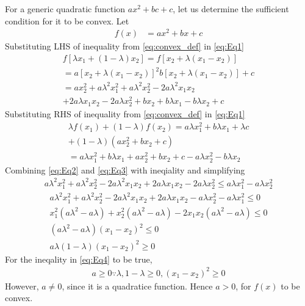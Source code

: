 \documentclass[12pt]{article}
\providecommand{\brak}[1]{\ensuremath{\left(#1\right)}}
\providecommand{\sbrak}[1]{\ensuremath{{}\left[#1\right]}}
\begin{document}
\begin{enumerate}
For a generic quadratic function $ax^2+bc+c$, let us determine the sufficient condition for it to be convex. Let 
\begin{align}
	\label{eq:Eq1}
	f\brak{x} &= ax^2+bx+c 
\end{align}
Substituting LHS of inequality from \eqref{eq:convex_def} in \eqref{eq:Eq1}
\begin{multline}
   \label{eq:Eq2}
	f\sbrak{\lambda x_1 + \brak{1-\lambda}x_2}  = f\sbrak{x_2 + \lambda \brak{x_1-x_2}}\\ 
	   =  a\sbrak{x_2+\lambda\brak{x_1-x_2}}^2 b\sbrak{x_2+\lambda\brak{x_1-x_2}} + c \\ 
	   = ax_2^2 + a\lambda^2 x_1^2+a\lambda^2 x_2^2 - 2a\lambda^2 x_1x_2 \\ 
	   +2a\lambda x_1x_2 - 2a\lambda x_2^2+bx_2+b\lambda x_1-b\lambda x_2+c 
\end{multline} 
Substituting RHS of inequality from \eqref{eq:convex_def} in \eqref{eq:Eq1}
\begin{multline}
	\lambda f\brak{x_1} + \brak{1-\lambda}f\brak{x_2}  = a \lambda x_1^2 + b\lambda x_1 + \lambda c \\ 
		 + \brak{1-\lambda}\brak{ax_2^2+bx_2+c} \\
	\label{eq:Eq3}
		= a \lambda x_1^2 + b\lambda x_1 + ax_2^2 + bx_2 + c -a\lambda x_2^2 -b\lambda x_2
\end{multline} 
Combining \eqref{eq:Eq2} and \eqref{eq:Eq3} with ineqiality and simplifying
\begin{align}
a\lambda^2 x_1^2 + a\lambda^2 x_2^2 - 2a\lambda^2 x_1x_2 +2a\lambda x_1x_2 - 2a\lambda x_2^2 \leq a\lambda x_1^2  -a\lambda x_2^2  
\end{align} 
\begin{multline}
	\label{eq:Eq4}
	a\lambda^2 x_1^2 + a\lambda^2 x_2^2 - 2a\lambda^2 x_1x_2 +2a\lambda x_1x_2 - a\lambda x_2^2 - a\lambda x_1^2 \leq 0 \\ 
	   x_1^2\brak{a\lambda^2-a\lambda} + x_2^2\brak{a\lambda^2 - a\lambda} - 2x_1x_2\brak{a\lambda^2-a\lambda} \leq 0 \\ 
	   \brak{a \lambda^2-a\lambda}\brak{x_1-x_2}^2 \leq 0\\
	   a\lambda\brak{1-\lambda}\brak{x_1-x_2}^2 \geq 0
\end{multline}
For the ineqality in \eqref{eq:Eq4} to be true,
\begin{align}
	a \geq 0 \because \lambda, 1-\lambda \geq 0, \brak{x_1-x_2}^2 \geq 0
\end{align}
However, $a \neq 0$, since it is a quadratice function. Hence $a > 0$, for $f\brak{x}$ to be convex.


\end{enumerate}
\end{document}
